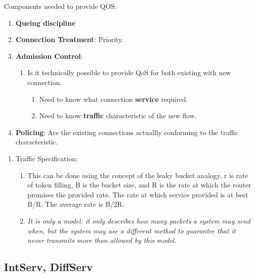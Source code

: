 \documentclass[12pt]{book}
\begin{document}
Components needed to provide QOS:
\begin{enumerate}
    \item \textbf{Queing discipline}
    \item \textbf{Connection Treatment}: Priority.
    \item \textbf{Admission Control}:
    \begin{enumerate}
        \item Is it technically possible to provide QoS for both existing with new connection.
        \begin{enumerate}
            \item Need to know what connection \textbf{service} required.
            \item Need to know \textbf{traffic} characteristic of the new flow.
        \end{enumerate}
    \end{enumerate}
    \item \textbf{Policing}: Are the existing connections actuallly conforming to the traffic characteristic.
\end{enumerate}

\begin{enumerate}
    \item Traffic Specification:
    \begin{enumerate}
        \item This can be done using the concept of the leaky bucket analogy, r is rate of token filling, B is the bucket size, and R is the rate at which the router promises the provided rate. The rate at which service provided is at best B/R. The average rate is B/2R.
        \item \textit{It is only a model: it only describes how many packets a system may send when, but the system may use a different method to guarantee that it never transmits more than allowed by this model.}
    \end{enumerate}
\end{enumerate}

\subsection{IntServ, DiffServ}
\end{document}
